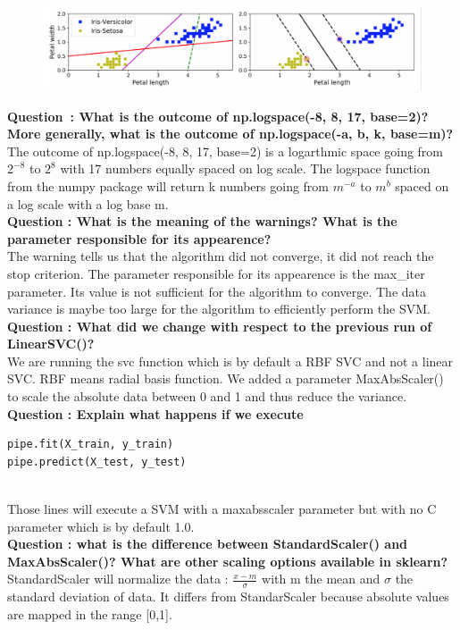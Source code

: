 \begin{figure}[ht]
	\centering 
	\includegraphics[scale = 0.35]{Pics/SVM}
	\label{fig:svmex}
\end{figure}

\textbf{{Question} : What is the outcome of np.logspace(-8, 8, 17, base=2)? More generally, what is the outcome of np.logspace(-a, b, k, base=m)?}\\
The outcome of np.logspace(-8, 8, 17, base=2) is a logarthmic space going from $2^{-8}$ to $2^8$ with 17 numbers equally spaced on log scale.
 The logspace function from the numpy package will return k numbers going from $m^{-a}$ to $m^b$ spaced on a log scale with a log base m. \\

\textbf{Question : What is the meaning of the warnings? What is the parameter responsible for its appearence?}\\
The warning tells us that the algorithm did not converge, it did not reach the stop criterion. The parameter responsible for its appearence is the max\_iter parameter. Its value is not sufficient for the algorithm to converge. The data variance is maybe too large for the algorithm to efficiently perform the SVM. \\

\textbf{Question : What did we change with respect to the previous run of LinearSVC()?} \\
We are running the svc function which is by default a RBF SVC and not a linear SVC. RBF means radial basis function. We added a parameter MaxAbsScaler() to scale the absolute data between 0 and 1 and thus reduce the variance. \\

\textbf{Question : Explain what happens if we execute} 
\begin{verbatim}pipe.fit(X_train, y_train)
pipe.predict(X_test, y_test)\end{verbatim} \\
Those lines will execute a SVM with a maxabsscaler parameter but with no C parameter which is by default 1.0.\\

\textbf{Question : what is the difference between StandardScaler() and MaxAbsScaler()? What are other scaling options available in sklearn? }\\
StandardScaler will normalize the data : $\frac{x-m}{\sigma}$ with m the mean and $\sigma$ the standard deviation of data. It differs from StandarScaler because absolute values are mapped in the range [0,1]. \\


